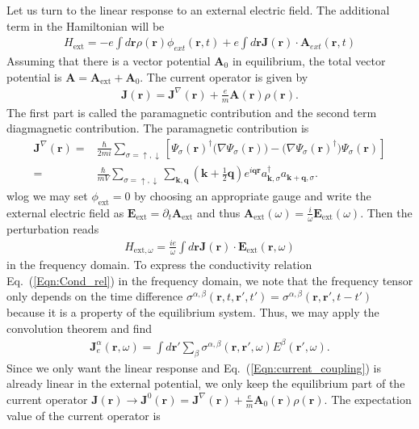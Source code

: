 \documentclass[english]{scrartcl}
\newcommand{\eq}[1]{Eq.~(\ref{#1})}
\begin{document}
Let us turn to the linear response to an external electric field. The additional term in the Hamiltonian will be 
\begin{align*}
H_\text{ext} = -e \int d \bm r \rho(\bm r) \phi_{ext}(\bm r, t) + e \int d\bm r \bm J(\bm r) \cdot \bm A_{ext}(\bm r, t)
\end{align*}
Assuming that there is a vector potential $\bm A_\text{0}$ in equilibrium, the total vector potential is $\bm A = \bm A_\text{ext} + \bm A_0$. The current operator is given by 
\begin{align*}
\bm J(\bm r) =  \bm J^\nabla (\bm r) + \frac{e}{m} \bm A (\bm r) \rho (\bm r).
\end{align*}
The first part is called the paramagnetic contribution and the second term diagmagnetic contribution. The paramagnetic contribution is
\begin{align*}
\bm J^\nabla (\bm r) =& \frac{\hbar}{2 m i} \sum_{\sigma = \uparrow, \downarrow} \left[\Psi_\sigma(\bm r)^\dagger \bigg( \nabla \Psi_\sigma(\bm r) \bigg)  - \bigg( \nabla \Psi_\sigma(\bm r) ^\dagger \bigg ) \Psi_\sigma(\bm r) \right] \\
=& \frac{\hbar}{m V} \sum_{\sigma = \uparrow, \downarrow} \sum_{\bm k, \bm q} \left ( \bm k + \frac{1}{2} \bm q \right) e^{i \bm q \bm r} a_{\bm k, \sigma}^\dagger a_{\bm k + \bm q, \sigma}.
\end{align*}
\gls{wlog} we may set $\phi_\text{ext} = 0$ by choosing an appropriate gauge and write the external electric field as $\bm E_\text{ext} = \partial_t \bm A_\text{ext}$ and thus $\bm A_\text{ext}(\omega) = \frac{i}{\omega} \bm E_\text{ext}(\omega)$. Then the perturbation reads
\begin{align}
H_{\text{ext}, \omega} =   \frac{i e}{\omega}  \int d\bm r \bm J(\bm r) \cdot \bm E_\text{ext}(\bm r, \omega) \label{Eqn:current_coupling}
\end{align}
in the frequency domain. To express the conductivity relation \eq{Eqn:Cond_rel} in the frequency domain, we note that the frequency tensor only depends on the time difference $\sigma^{\alpha, \beta}(\bm r , t, \bm r', t') = \sigma^{\alpha, \beta}(\bm r , \bm r', t - t')$ because it is a property of the equilibrium system. Thus, we may apply the convolution theorem and find
\begin{align}
\bm J^\alpha_e(\bm r , \omega) = \int d \bm r' \sum_\beta \sigma^{\alpha, \beta}(\bm r , \bm r', \omega) E^\beta (\bm r', \omega). \label{Eqn:cond_omega}
\end{align}
Since we only want the linear response and \eq{Eqn:current_coupling} is already linear in the external potential, we only keep the equilibrium part of the current operator $\bm J(\bm r) \to \bm J^0(\bm r) =  \bm J^\nabla (\bm r) + \frac{e}{m} \bm A_0 (\bm r) \rho (\bm r)$. The expectation value of  the current operator is 
\end{document}

